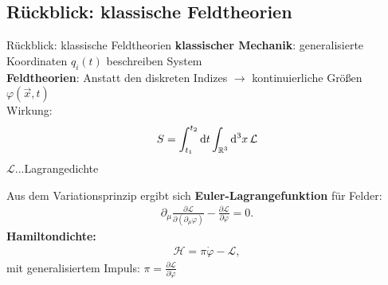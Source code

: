 \documentclass[mathserif]{beamer}
\theoremstyle{definition}
\begin{document}
\subsection{Rückblick: klassische Feldtheorien}
	\begin{frame}{Rückblick: klassische Feldtheorien}
		\textbf{klassischer Mechanik}: generalisierte Koordinaten $q_i(t)$ beschreiben System\\
		\textbf{Feldtheorien}: Anstatt den diskreten Indizes $\rightarrow$ kontinuierliche Größen $\varphi(\vec{x},t)$\\
		\pause
		Wirkung:
		\begin{align}
			S=\int_{t_1}^{t_2}{\rm d}t\int_{\mathbb{R}^3}{\rm d}^3 x\, \mathcal{L}
		\end{align}
		$\mathcal{L}$...Lagrangedichte
	\end{frame}
	\begin{frame}
		Aus dem Variationsprinzip ergibt sich \textbf{Euler-Lagrangefunktion} für Felder:
		\begin{align}
			\partial_\mu \frac{\partial \mathcal{L}}{\partial (\partial_\mu \varphi)}-\frac{\partial \mathcal{L}}{\partial \varphi}=0.
		\end{align}
		\pause
		\textbf{Hamiltondichte:}
		\begin{align}
			\mathcal{H}=\pi\dot{\varphi}-\mathcal{L},
		\end{align}
		mit generalisiertem Impuls: $\pi=\frac{\partial\mathcal{L}}{\partial \dot{\varphi}}$
	\end{frame}
\end{document}
